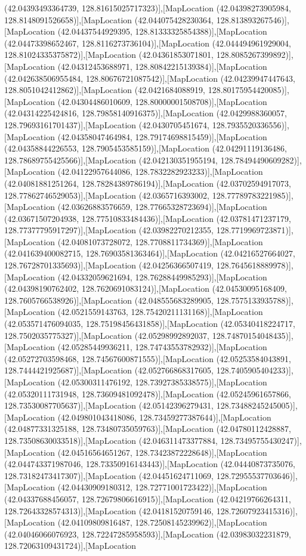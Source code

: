 (42.04393493364739, 128.81615025717323)],[MapLocation (42.04398273905984, 128.8148091526658)],[MapLocation (42.044075428230364, 128.813893267546)],[MapLocation (42.04437544929395, 128.81333325854388)],[MapLocation (42.04473398652467, 128.8116273736104)],[MapLocation (42.044494961929004, 128.81024335375872)],[MapLocation (42.04361853071801, 128.8085267399892)],[MapLocation (42.04312453688971, 128.80842215139384)],[MapLocation (42.042638506955484, 128.80676721087542)],[MapLocation (42.04239947447643, 128.8051042412862)],[MapLocation (42.0421684088919, 128.80175954420085)],[MapLocation (42.04304486010609, 128.80000001508708)],[MapLocation (42.04314225424816, 128.79858140916375)],[MapLocation (42.0429988360057, 128.79693161701437)],[MapLocation (42.0430705451674, 128.7935520336556)],[MapLocation (42.04358047464984, 128.79174698815459)],[MapLocation (42.04358844226553, 128.7905453585159)],[MapLocation (42.04291119136486, 128.78689755425566)],[MapLocation (42.042130351955194, 128.78494490609282)],[MapLocation (42.04122957644086, 128.7832282923233)],[MapLocation (42.04081881251264, 128.78284389786194)],[MapLocation (42.03702594917073, 128.77862746529053)],[MapLocation (42.0365716393002, 128.77789783221985)],[MapLocation (42.03626883576659, 128.77665328723694)],[MapLocation (42.03671507204938, 128.77510833484436)],[MapLocation (42.03781471237179, 128.77377795917297)],[MapLocation (42.03982270212355, 128.7719969723871)],[MapLocation (42.04081073728072, 128.7708811734369)],[MapLocation (42.041639400082715, 128.76903581363464)],[MapLocation (42.04216527664027, 128.76728701335693)],[MapLocation (42.04256366507419, 128.7645618889978)],[MapLocation (42.04332059621694, 128.76288449985293)],[MapLocation (42.04398190762402, 128.7620691083124)],[MapLocation (42.04530095168409, 128.7605766538926)],[MapLocation (42.048555683289905, 128.7575133935788)],[MapLocation (42.0521559143763, 128.75420211131168)],[MapLocation (42.053571476094035, 128.75198456431858)],[MapLocation (42.05340418224717, 128.7502035775327)],[MapLocation (42.05298992892037, 128.74870154048435)],[MapLocation (42.05285449936211, 128.74743553782932)],[MapLocation (42.05272703598468, 128.74567600871555)],[MapLocation (42.05253584043891, 128.7444421925687)],[MapLocation (42.052766868317605, 128.7405905404233)],[MapLocation (42.05300311476192, 128.73927385338575)],[MapLocation (42.05320111731948, 128.73609481092478)],[MapLocation (42.05245961657866, 128.73530087705637)],[MapLocation (42.05142396279431, 128.73488245245005)],[MapLocation (42.049801043418086, 128.73459277387644)],[MapLocation (42.04877331325188, 128.73480735059763)],[MapLocation (42.04780112428887, 128.73508630033518)],[MapLocation (42.046311473377884, 128.73495755430247)],[MapLocation (42.04516564651267, 128.73423872228648)],[MapLocation (42.044743371987046, 128.73350916143443)],[MapLocation (42.04440873735076, 128.73182473417307)],[MapLocation (42.04451624711069, 128.72955537703646)],[MapLocation (42.04430909180312, 128.72771001723422)],[MapLocation (42.04337688456057, 128.72679806616915)],[MapLocation (42.04219766264311, 128.72643328574313)],[MapLocation (42.04181520759146, 128.72607923415316)],[MapLocation (42.04109809816487, 128.72508145239962)],[MapLocation (42.04046066076923, 128.72247285958593)],[MapLocation (42.03983032231879, 128.72063109431724)],[MapLocation 